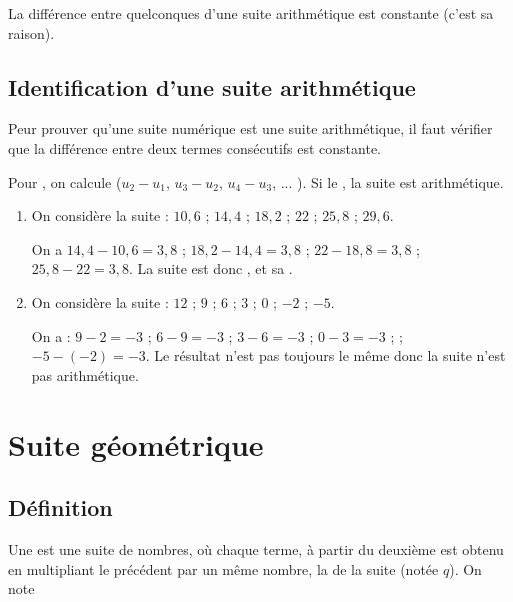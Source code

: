 \documentclass[12pt,a4paper]{article}
\begin{document}
\begin{myprop}
	La différence entre  quelconques d'une suite arithmétique est constante (c'est sa raison).
\end{myprop}

\subsection{Identification d'une suite arithmétique}
\begin{mymeth}
	Peur prouver qu'une suite numérique est une suite arithmétique, il faut vérifier que la différence entre deux termes consécutifs est constante.
	
	Pour , on calcule  ($u_2 - u_1$, $u_3 - u_2$, $u_4-u_3$, ... ). Si le , la suite est arithmétique.

\end{mymeth}

\begin{myexs}
	\begin{enumerate}
		\item On considère la suite : $10,6$ ; $14,4$ ; $18,2$ ; $22$ ; $25,8$ ; $29,6$.
		
		On a $14,4-10,6=3,8$ ; $18,2 -14,4=3,8$ ; $22 -18,8=3,8$ ; $25,8-22=3,8$.
		La suite est donc , et sa .
		
		\item On considère la suite : $12$ ; $9$ ; $6$ ; $3$ ; $0$ ; $-2$ ; $-5$.
		
		On a : $9-2=-3$  ; $6-9=-3$ ; $3-6=-3$ ; $0-3=-3$ ;  ; $-5-(-2)=-3$.
		Le résultat n'est pas toujours le même donc la suite n'est pas arithmétique.
	\end{enumerate}
\end{myexs}

\section{Suite géométrique}

\subsection{Définition}
\begin{mydef}
	Une  est une suite de nombres, où chaque terme, à partir du deuxième est obtenu en multipliant le précédent par un même nombre, la  de la suite (notée $q$).	
	On note
\end{mydef}
\end{document}
